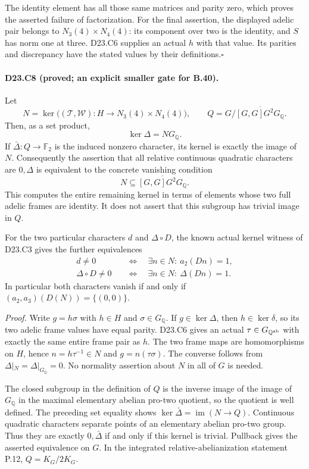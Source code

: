 The identity element has all those same matrices and parity zero,
which proves the asserted failure of factorization.  For the final
assertion, the displayed adelic pair belongs to
$N_3(4)\times N_4(4)$: its component over two is the identity,
and $S$ has norm one at three.  D23.C6 supplies an actual $h$
with that value.  Its parities and discrepancy have the stated
values by their definitions.\hfill$\square$

\paragraph{D23.C8 (proved; an explicit smaller gate for B.40).}
Let
\[
 N=\ker\bigl((\mathcal T,\mathcal W):H\longrightarrow
                   N_3(4)\times N_4(4)\bigr),
 \qquad
 Q=G/\overline{[G,G]G^2G_{\mathbb Q}}.
\]
Then, as a set product,
\[
 \ker\Delta=N G_{\mathbb Q}.
\]
If $\bar\Delta:Q\to\mathbb F_2$ is the induced nonzero
character, its kernel is exactly the image of $N$.  Consequently
the assertion that all relative continuous quadratic characters
are $0,\Delta$ is equivalent to the concrete vanishing condition
\[
 N\subseteq\overline{[G,G]G^2G_{\mathbb Q}}.
\]
This computes the entire remaining kernel in terms of elements
whose two full adelic frames are identity.  It does not assert
that this subgroup has trivial image in $Q$.

For the two particular characters $d$ and $\Delta\circ D$,
the known actual kernel witness of D23.C3 gives the further
equivalences
\[
 \begin{split}
 d\ne0&\quad\Longleftrightarrow\quad
      \exists n\in N:\ a_2(Dn)=1,\\
 \Delta\circ D\ne0&\quad\Longleftrightarrow\quad
      \exists n\in N:\ \Delta(Dn)=1.
 \end{split}
\]
In particular both characters vanish if and only if
$(a_2,a_3)(D(N))=\{(0,0)\}$.

\emph{Proof.}
Write $g=h\sigma$ with $h\in H$ and $\sigma\in G_{\mathbb Q}$.
If $g\in\ker\Delta$, then $h\in\ker\delta$, so its two
adelic frame values have equal parity.  D23.C6 gives an actual
$\tau\in G_{\mathbb Q^{\rm ab}}$ with exactly the same entire
frame pair as $h$.  The two frame maps are homomorphisms on
$H$, hence $n=h\tau^{-1}\in N$ and $g=n(\tau\sigma)$.
The converse follows from $\Delta|_N=\Delta|_{G_{\mathbb Q}}=0$.
No normality assertion about $N$ in all of $G$ is needed.

The closed subgroup in the definition of $Q$ is the inverse
image of the image of $G_{\mathbb Q}$ in the maximal elementary
abelian pro-two quotient, so the quotient is well defined.
The preceding set equality shows
$\ker\bar\Delta=\operatorname{im}(N\to Q)$.  Continuous
quadratic characters separate points of an elementary abelian
pro-two group.  Thus they are exactly $0,\bar\Delta$ if and
only if this kernel is trivial.  Pullback gives the asserted
equivalence on $G$.  In the integrated relative-abelianization
statement P.12, $Q=K_G/2K_G$.

